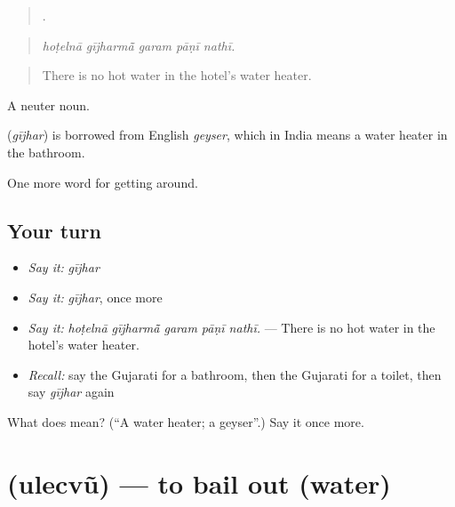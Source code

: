 \begin{quote}
    .
\end{quote}

\begin{quote}
\emph{hoṭelnā gījharmā̃ garam pāṇī nathī.}
\end{quote}

\begin{quote}
There is no hot water in the hotel's water heater.
\end{quote}

A neuter noun.

\begin{cousinweb}
\textbf{} (\emph{gījhar}) is borrowed from English \emph{geyser}, which in India means a water heater in the bathroom.
\end{cousinweb}

\begin{grammarlens}[title={What you've built}]
One more word for getting around.
\end{grammarlens}

\subsection*{Your turn}
\begin{itemize}
\raggedright
  \item \emph{Say it:} \emph{gījhar}
  \item \emph{Say it:} \emph{gījhar}, once more
  \item \emph{Say it:} \emph{hoṭelnā gījharmā̃ garam pāṇī nathī.} — There is no hot water in the hotel's water heater.
  \item \emph{Recall:} say the Gujarati for a bathroom, then the Gujarati for a toilet, then say \emph{gījhar} again
\end{itemize}

\begin{tcolorbox}[breakable,colback=teal!4,colframe=teal!35!black,title={Before you move on}]
What does  mean? (\textquotedblleft{}A water heater; a geyser\textquotedblright{}.) Say it once more.
\end{tcolorbox}
\section[\texorpdfstring{\gu{ઉલેચવું} (ulecvũ)}{ઉલેચવું (ulecvũ)}]{ (ulecvũ) — to bail out (water)}

\label{lesson:GU-C410-ulecvu}



